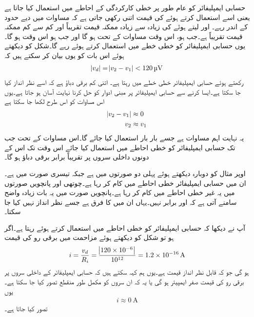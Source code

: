 حسابی ایمپلیفائر کو عام طور  پر خطی کارکردگی کے احاطے میں استعمال کیا جاتا ہے یعنی اسے  استعمال کرتے ہوئے   کی قیمت اتنی رکھی جاتی ہے کہ  مساوات  میں دیے حدود کے اندر رہے۔ اور  لیتے ہوئے  کی زیادہ سے زیادہ ممکنہ قیمت تقریباً اور کم سے کم ممکنہ قیمت تقریباً  ہے۔جب ہو،  اس وقت مساوات   کے تحت  ہو گا اور جب   ہو اس وقت ہو گا۔یوں حسابی ایمپلیفائر کو خطی خطے میں استعمال کرتے ہوئے  رہے گا۔شکل   کو دیکھتے ہوئے اس بات کو یوں بیان کر سکتے ہیں کہ
\begin{align}
\abs{v_d} =\abs{v_2-v_1} < \SI{120}{\micro \volt}
\end{align}
رکھتے ہوئے حسابی ایمپلیفائر خطی خطے میں رہتا ہے۔ اتنی کم برقی دباؤ ہے کہ اسے نظر انداز کیا جا سکتا ہے۔ایسا کرنے سے حسابی ایمپلیفائر پر مبنی ادوار کو حل کرنا نہایت آسان ہو جاتا ہے۔یوں  اس مساوات کو اس طرح لکھا جا سکتا ہے
\begin{gather}
\begin{aligned} \label{مساوات_حسابی_داخلی_سروں_پر_برابر_دباو}
\abs{v_2  -  v_1} &\approx 0   \\
v_2 & \approx v_1
\end{aligned}
\end{gather}
	یہ نہایت اہم مساوات ہے  جسے  بار بار استعمال کیا جائے گا۔اس مساوات کے تحت جب تک حسابی ایمپلیفائر کو خطی احاطے میں استعمال کیا جائے اس وقت تک اس کے دونوں داخلی سروں پر تقریباً برابر برقی دباؤ ہو گا۔

	اوپر مثال کو دوبارہ دیکھتے ہوئے پہلی دو صورتوں میں ہے جبکہ تیسری صورت میں  ہے۔ان میں حسابی ایمپلیفائر خطی احاطے میں کام کر رہا ہے۔چوتھی اور پانچویں صورتوں میں یہ غیر خطی احاطے میں کام کر رہا ہے۔پانچویں صورت میں یہ بات زیادہ واضح سامنے آتی ہے کہ  اور برابر نہیں۔یہاں ان میں   کا فرق ہے جسے نظر انداز نہیں کیا جا سکتا۔

	آپ نے دیکھا کہ حسابی ایمپلیفائر کو خطی احاطے میں استعمال کرتے ہوئے   رہتا ہے۔اگر ہو تو شکل   کو دیکھتے ہوئے مزاحمت میں برقی رو  کی قیمت
\begin{align}
i=\frac{v_d}{R_i} =\frac{\abs{120 \times 10^{-6}}}{10^{12}}=\SI{1.2e-16}{\ampere}
\end{align}
ہو گی جو کہ قابل نظر انداز قیمت ہے۔یوں ہم کہہ سکتے ہیں کہ حسابی ایمپلیفائر کے داخلی سروں پر برقی رو کی قیمت صفر ایمپیئر ہو گی یا یہ کہ ان سروں کو مکمل طور منقطع تصور کیا جا سکتا ہے۔یوں
\begin{align} \label{مساوات_حسابی_صفر_داخلی_رو}
{i \approx \SI{0}{\ampere}}
\end{align}
تصور کیا جاتا ہے۔


